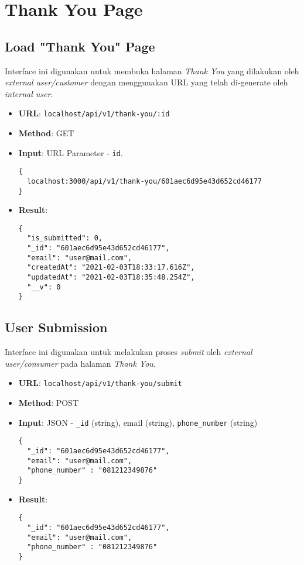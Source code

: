 \documentclass[a4paper]{report}
\begin{document}
\section{Thank You Page}
 
\subsection{Load "Thank You" Page}
Interface ini digunakan untuk membuka halaman \textit{Thank You} yang dilakukan oleh \textit{external user/customer} dengan menggunakan URL yang telah di-generate oleh \textit{internal user}.
\begin{itemize}
  \item \textbf{URL}: \verb|localhost/api/v1/thank-you/:id| 
  \item \textbf{Method}: GET
  \item \textbf{Input}: URL Parameter - \verb|id|.
    \begin{lstlisting}
{
  localhost:3000/api/v1/thank-you/601aec6d95e43d652cd46177
}
    \end{lstlisting}
  \item \textbf{Result}:
    \begin{lstlisting}
{
  "is_submitted": 0,
  "_id": "601aec6d95e43d652cd46177",
  "email": "user@mail.com",
  "createdAt": "2021-02-03T18:33:17.616Z",
  "updatedAt": "2021-02-03T18:35:48.254Z",
  "__v": 0
}
    \end{lstlisting}
\end{itemize}

\subsection{User Submission}
Interface ini digunakan untuk melakukan proses \textit{submit} oleh \textit{external user/consumer} pada halaman \textit{Thank You}.
\begin{itemize}
  \item \textbf{URL}: \verb|localhost/api/v1/thank-you/submit| 
  \item \textbf{Method}: POST
  \item \textbf{Input}: JSON - \verb|_id| (string), email (string), \verb|phone_number| (string)
    \begin{lstlisting}
{
  "_id": "601aec6d95e43d652cd46177",
  "email": "user@mail.com",
  "phone_number" : "081212349876"
}
    \end{lstlisting}
  \item \textbf{Result}:
    \begin{lstlisting}
{
  "_id": "601aec6d95e43d652cd46177",
  "email": "user@mail.com",
  "phone_number" : "081212349876"
}
    \end{lstlisting}
\end{itemize}
         
\end{document}
